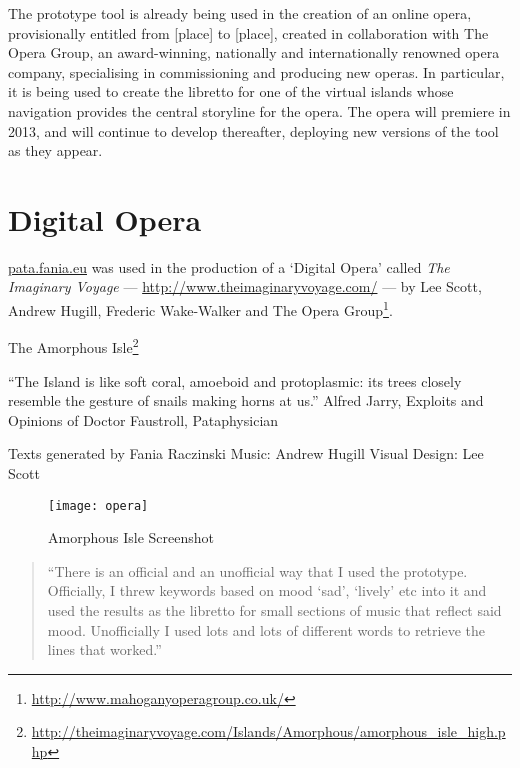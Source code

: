 \begin{draft}
  The prototype tool is already being used in the creation of an online opera, provisionally entitled from [place] to [place], created in collaboration with The Opera Group, an award-winning, nationally and internationally renowned opera company, specialising in commissioning and producing new operas. In particular, it is being used to create the libretto for one of the virtual islands whose navigation provides the central storyline for the opera. The opera will premiere in 2013, and will continue to develop thereafter, deploying new versions of the tool as they appear.
\end{draft}


\section{Digital Opera}

\url{pata.fania.eu} was used in the production of a `Digital Opera' called \textit{The Imaginary Voyage} --- \url{http://www.theimaginaryvoyage.com/} --- by Lee Scott, Andrew Hugill, Frederic Wake-Walker and The Opera Group\footnote{\url{http://www.mahoganyoperagroup.co.uk/}}.

The Amorphous Isle\footnote{\url{http://theimaginaryvoyage.com/Islands/Amorphous/amorphous_isle_high.php}}

``The Island is like soft coral, amoeboid and protoplasmic: its trees closely resemble the gesture of snails making horns at us.''
Alfred Jarry, Exploits and Opinions of Doctor Faustroll, Pataphysician


Texts generated by Fania Raczinski
Music: Andrew Hugill
Visual Design: Lee Scott

\begin{figure}[h!]
  \centering
  \texttt{[image: opera]}
\caption[Amorphous Isle Screenshot]{Amorphous Isle Screenshot}
\label{fig:opera}
\end{figure}

\begin{quotation}
  ``There is an official and an unofficial way that I used the prototype. Officially, I threw keywords based on mood `sad', `lively' etc into it and used the results as the libretto for small sections of music that reflect said mood. Unofficially I used lots and lots of different words to retrieve the lines that worked.'' 
\end{quotation}

